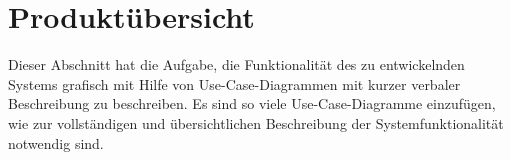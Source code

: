 \chapter{Produktübersicht}
Dieser Abschnitt hat die Aufgabe, die Funktionalität des zu entwickelnden
Systems  grafisch mit Hilfe von Use-Case-Diagrammen mit kurzer verbaler
Beschreibung zu beschreiben. Es sind so viele Use-Case-Diagramme einzufügen,
wie zur vollständigen und übersichtlichen Beschreibung der Systemfunktionalität
notwendig sind.
